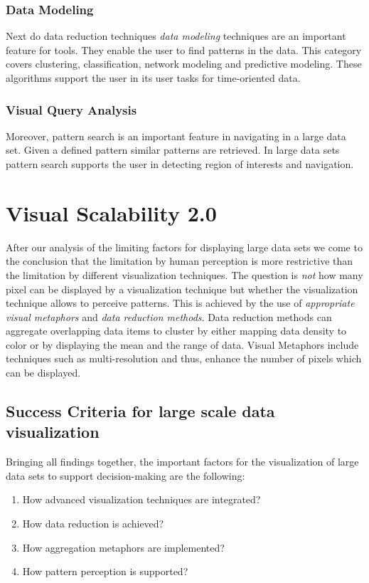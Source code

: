 \subsubsection{Data Modeling}
Next do data reduction techniques \textit{data modeling} techniques are an important feature for tools. They enable the user to find patterns in the data. This category covers clustering, classification, network modeling and predictive modeling\cite{Zhanga}. These algorithms support the user in its user tasks for time-oriented data.

\subsubsection{Visual Query Analysis}
Moreover, pattern search is an important feature in navigating in a large data set. Given a defined pattern similar patterns are retrieved. In large data sets pattern search supports the user in detecting region of interests and navigation. 





\section{Visual Scalability 2.0}
After our analysis of the limiting factors for displaying large data sets we come to the conclusion that the limitation by human perception is more restrictive than the limitation by different visualization techniques. The question is \textit{not} how many pixel can be displayed by a visualization technique but whether the visualization technique allows to perceive patterns. This is achieved by the use of \textit{appropriate visual metaphors} and \textit{data reduction methods}. Data reduction methods can aggregate overlapping data items to cluster by either mapping data density to color or by displaying the mean and the range of data. Visual Metaphors include techniques such as multi-resolution and thus, enhance the number of pixels which can be displayed. 

\subsection{Success Criteria for large scale data visualization}
Bringing all findings together, the important factors for the visualization of large data sets to support decision-making are the following: 
\begin{enumerate}
\item How advanced visualization techniques are integrated? 
\item How data reduction is achieved? 
\item How aggregation metaphors are implemented? 
\item How pattern perception is supported? 
\end{enumerate}

